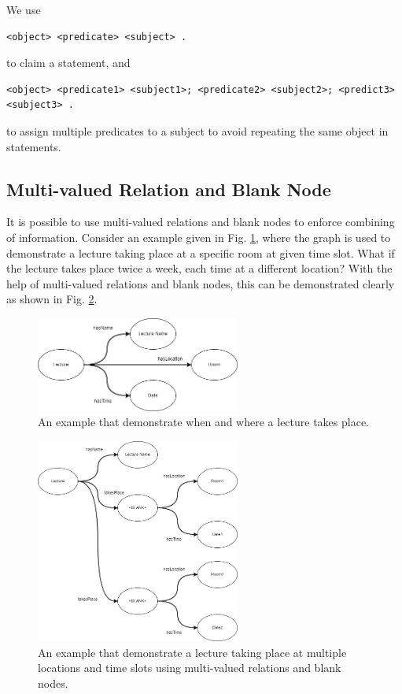 We use
\begin{lstlisting}
<object> <predicate> <subject> .
\end{lstlisting}
to claim a statement, and
\begin{lstlisting}
<object> <predicate1> <subject1>; <predicate2> <subject2>; <predict3> <subject3> .
\end{lstlisting}
to assign multiple predicates to a subject to avoid repeating the same object in statements.

\subsection{Multi-valued Relation and Blank Node}

It is possible to use multi-valued relations and blank nodes to enforce combining of information. Consider an example given in Fig. \ref{fig:lectureexp}, where the graph is used to demonstrate a lecture taking place at a specific room at given time slot. What if the lecture takes place twice a week, each time at a different location? With the help of multi-valued relations and blank nodes, this can be demonstrated clearly as shown in Fig. \ref{fig:lectureexp2}.
\begin{figure}[htbp]
	\centering
	\includegraphics[width=0.6\textwidth]{./chapters/ch-semanticwebarchitecture/figures/lectureexp.png}
	\caption{An example that demonstrate when and where a lecture takes place.}
	\label{fig:lectureexp}
\end{figure}

\begin{figure}[htbp]
	\centering
	\includegraphics[width=0.6\textwidth]{./chapters/ch-semanticwebarchitecture/figures/lectureexp2.png}
	\caption{An example that demonstrate a lecture taking place at multiple locations and time slots using multi-valued relations and blank nodes.}
	\label{fig:lectureexp2}
\end{figure}

